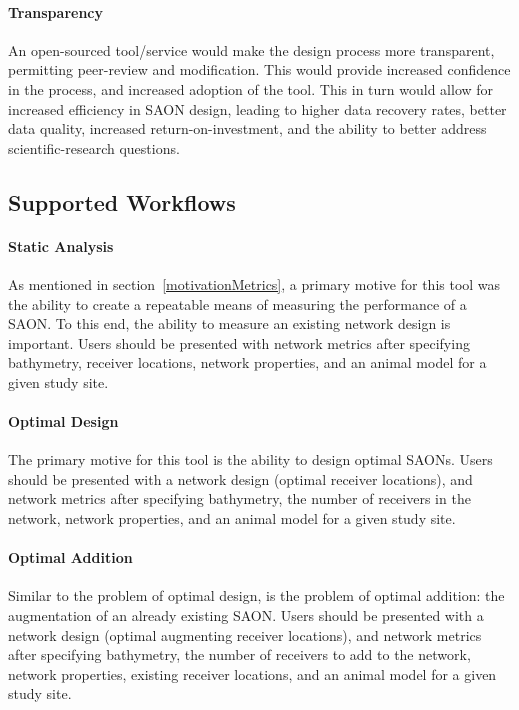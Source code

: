 \paragraph{Transparency}
\label{motivationTransparency}
An open-sourced tool/service would make the design process more transparent, permitting peer-review and modification.  This would provide increased confidence in the process, and increased adoption of the tool.  This in turn would allow for increased efficiency in SAON design, leading to higher data recovery rates, better data quality, increased return-on-investment, and the ability to better address scientific-research questions.


\subsection{Supported Workflows}
\paragraph{Static Analysis}
As mentioned in section~\ref{motivationMetrics}, a primary motive for this tool was the ability to create a repeatable means of measuring the performance of a SAON.  To this end, the ability to measure an existing network design is important.  Users should be presented with network metrics after specifying bathymetry, receiver locations, network properties, and an animal model for a given study site.


\paragraph{Optimal Design}
The primary motive for this tool is the ability to design optimal SAONs.  Users should be presented with a network design (optimal receiver locations), and network metrics after specifying bathymetry, the number of receivers in the network, network properties, and an animal model for a given study site.


\paragraph{Optimal Addition}
Similar to the problem of optimal design, is the problem of optimal addition: the augmentation of an already existing SAON.  Users should be presented with a network design (optimal augmenting receiver locations), and network metrics after specifying bathymetry, the number of receivers to add to the network, network properties, existing receiver locations, and an animal model for a given study site.


